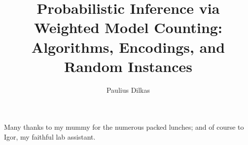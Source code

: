 \documentclass[phd,aiai,twoside]{infthesis}
\title{Probabilistic Inference via Weighted Model Counting: Algorithms, Encodings, and Random Instances}
\author{Paulius Dilkas}
\begin{document}
\begin{preliminary}

\maketitle

\begin{acknowledgements}
  Many thanks to my mummy for the numerous packed lunches; and of course to Igor, my faithful lab assistant.
\end{acknowledgements}

\standarddeclaration


\tableofcontents


\end{preliminary}







\end{document}
